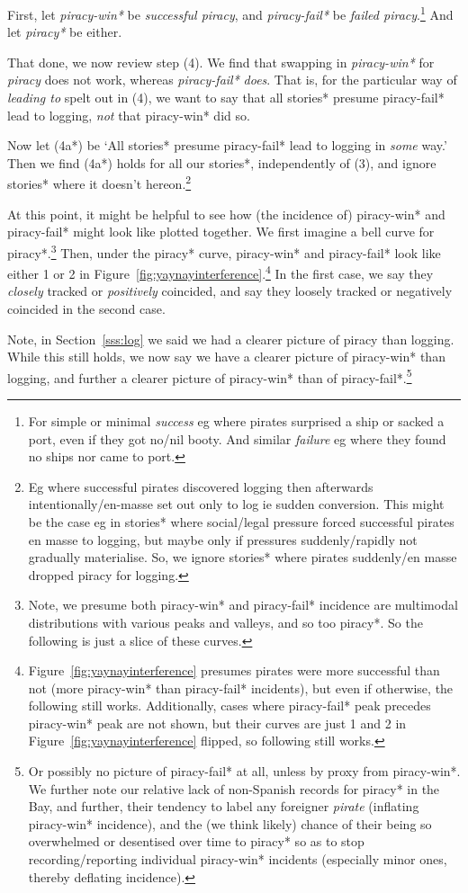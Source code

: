 \documentclass{amsart}
\newcommand{\ment}{\textit} %
\theoremstyle{definition}
\theoremstyle{remark}
\begin{document}
		First, let \ment{piracy-win*} be \ment{successful piracy}, and \ment{piracy-fail*} be \ment{failed piracy}.\footnote{For simple or minimal \ment{success} eg where pirates surprised a ship or sacked a port, even if they got no/nil booty. And similar \ment{failure} eg where they found no ships nor came to port.} And let \ment{piracy*} be either.
		
		That done, we now review step (4). We find that swapping in \ment{piracy-win*} for \ment{piracy} does not work, whereas \ment{piracy-fail*} \emph{does}. That is, for the particular way of \ment{leading to} spelt out in (4), we want to say that all stories* presume piracy-fail* lead to logging, \emph{not} that piracy-win* did so.
		
		Now let (4a*) be `All stories* presume piracy-fail* lead to logging in \emph{some} way.' Then we find (4a*) holds for all our stories*, independently of (3), and ignore stories* where it doesn't hereon.\footnote{Eg where successful pirates discovered logging then afterwards intentionally/en-masse set out only to log ie sudden conversion. This might be the case eg in stories* where social/legal pressure forced successful pirates en masse to logging, but maybe only if pressures suddenly/rapidly not gradually materialise. So, we ignore stories* where pirates suddenly/en masse dropped piracy for logging.}
		
		At this point, it might be helpful to see how (the incidence of) piracy-win* and piracy-fail* might look like plotted together. We first imagine a bell curve for piracy*.\footnote{Note, we presume both piracy-win* and piracy-fail* incidence are multimodal distributions with various peaks and valleys, and so too piracy*. So the following is just a slice of these curves.} Then, under the piracy* curve, piracy-win* and piracy-fail* look like either 1 or 2 in Figure~\ref{fig:yaynayinterference}.\footnote{Figure~\ref{fig:yaynayinterference} presumes pirates were more successful than not (more piracy-win* than piracy-fail* incidents), but even if otherwise, the following still works. Additionally, cases where piracy-fail* peak precedes piracy-win* peak are not shown, but their curves are just 1 and 2 in Figure~\ref{fig:yaynayinterference} flipped, so following still works.} In the first case, we say they \emph{closely} tracked or \emph{positively} coincided, and say they loosely tracked or negatively coincided in the second case.
		
		Note, in Section~\ref{sss:log} we said we had a clearer picture of piracy than logging. While this still holds, we now say we have a clearer picture of piracy-win* than logging, and further a clearer picture of piracy-win* than of piracy-fail*.\footnote{Or possibly no picture of piracy-fail* at all, unless by proxy from piracy-win*. We further note our relative lack of non-Spanish records for piracy* in the Bay, and further, their tendency to label any foreigner \ment{pirate} (inflating piracy-win* incidence), and the (we think likely) chance of their being so overwhelmed or desentised over time to piracy* so as to stop recording/reporting individual piracy-win* incidents (especially minor ones, thereby deflating incidence).}
		
\end{document}

